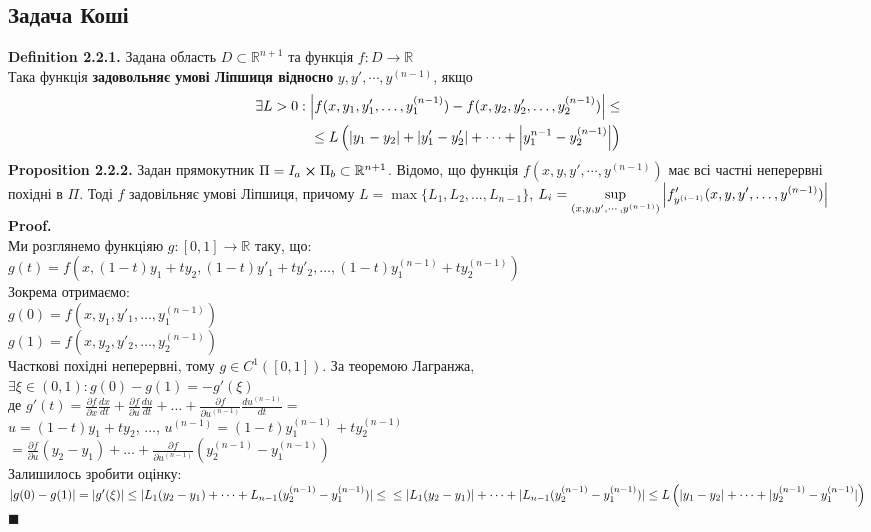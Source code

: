 \documentclass[a4paper, 14pt]{extarticle}
\def\huge{\displaystyle}
\def\defin#1{\textbf{Definition {#1}}}
\def\prp#1{\textbf{Proposition {#1}}}
\def\proof{\textbf{Proof.}\\}
\def\qed{$\blacksquare$}
\begin{document}
	\subsection{Задача Коші}
	\defin{2.2.1.} Задана область $D \subset \mathbb{R}^{n+1}$ та функція $f: D \rightarrow 	\mathbb{R}$\\
	Така функція \textbf{задовольняє умові Ліпшиця відносно} $y,y',\cdots,y^{(n-1)}$, якщо
	\begin{align*}
	\exists L>0: \abs{f(x,y_1, y'_1,\dots, y^{(n-1)}_1) - f(x,y_2, y'_2,\dots, y^{(n-1)}_2)} \leq \\ \leq L\left(\abs{y_1-y_2}+\abs{y'_1-y'_2}+\dots+\abs{y^{n-1}_1-y^{(n-1)}_2}\right)
	\end{align*}	
	\prp{2.2.2.} Задан прямокутник $\Pi = I_a \cross \Pi_b \subset \mathbb{R}^{n+1}$. Відомо, що функція $f(x,y,y',\cdots,y^{(n-1)})$ має всі частні неперервні похідні в $\Pi$. Тоді $f$ задовільняє умові Ліпшиця, причому $L=\max\{L_1,L_2, \dots, L_{n-1}\}$, $\huge L_i = \sup_{(x,y,y',\cdots,y^{(n-1)})} \abs{f'_{y^{(i-1)}} (x,y,y',\dots,y^{(n-1)})}$\\
	\proof
	Ми розглянемо функціяю $g: [0,1] \rightarrow \mathbb{R}$ таку, що:\\
	$\huge g(t) = f(x, (1-t)y_1 + ty_2, (1-t)y'_1+ty'_2, \dots, (1-t)y^{(n-1)}_1+ty^{(n-1)}_2)$\\
	Зокрема отримаємо:\\
	$g(0) = f(x,y_1, y'_1, \dots, y^{(n-1)}_1)$\\
	$g(1) = f(x,y_2, y'_2, \dots, y^{(n-1)}_2)$\\
	Часткові похідні неперервні, тому $g \in C^1([0,1])$. За теоремою Лагранжа,\\
	$\exists \xi \in (0,1): g(0) - g(1) = -g'(\xi)$\\
	де $\huge g'(t) = \frac{\partial f}{\partial x} \frac{dx}{dt} +  \frac{\partial f}{\partial u} \frac{du}{dt} + \dots +  \frac{\partial f}{\partial u^{(n-1)}} \frac{du^{(n-1)}}{dt} \boxed{=}$\\
	$u = (1-t)y_1+ty_2$, $\dots$, $u^{(n-1)} = (1-t)y^{(n-1)}_1 + ty^{(n-1)}_2$\\
	$\huge \boxed{=} \frac{\partial f}{\partial u} (y_2-y_1) + \dots +  \frac{\partial f}{\partial u^{(n-1)}} (y^{(n-1)}_2-y^{(n-1)}_1)$\\
	Залишилось зробити оцінку:\\
	$|g(0) - g(1)| = |g'(\xi)| \leq |L_1(y_2-y_1)+\dots+L_{n-1}(y^{(n-1)}_2-y^{(n-1)}_1)| \leq \\ \leq |L_1(y_2-y_1)| +\dots+ |L_{n-1}(y^{(n-1)}_2-y^{(n-1)}_1)| \leq L\left(|y_1-y_2|+\dots+|y^{(n-1)}_2-y^{(n-1)}_1|\right)$ \qed
\end{document}
